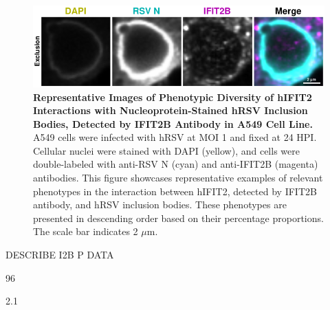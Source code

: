 \begin{figure}
    \centering
    \includegraphics[width=1\linewidth]{08. Chapter 3/Figs/02. Infection/02. IFIT2/02. IFIT2B/03. i2b a549 hrsv n.pdf} 
    \caption[Representative Images of Phenotypic Diversity of hIFIT2 Interactions with Nucleoprotein-Stained hRSV Inclusion Bodies, Detected by IFIT2B Antibody in A549 Cell Line.]{\textbf{Representative Images of Phenotypic Diversity of hIFIT2 Interactions with Nucleoprotein-Stained hRSV Inclusion Bodies, Detected by IFIT2B Antibody in A549 Cell Line.} A549 cells were infected with hRSV at MOI 1 and fixed at 24 HPI. Cellular nuclei were stained with DAPI (yellow), and cells were double-labeled with anti-RSV N (cyan) and anti-IFIT2B (magenta) antibodies. This figure showcases representative examples of relevant phenotypes in the interaction between hIFIT2, detected by IFIT2B antibody, and hRSV inclusion bodies. These phenotypes are presented in descending order based on their percentage proportions. The scale bar indicates 2 \(\mu \mbox{m}\).}
    \label{fig:Representative Images of Phenotypic Diversity of hIFIT2 Interactions with Nucleoprotein-Stained hRSV Inclusion Bodies, Detected by IFIT2B Antibody in A549 Cell Line}
\end{figure}

DESCRIBE I2B P DATA

96

2.1


